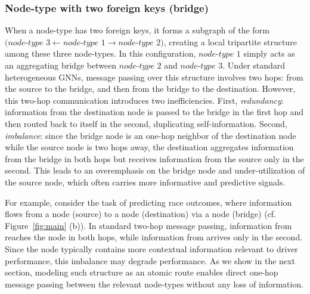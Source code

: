 \documentclass{article}
\theoremstyle{plain}
\theoremstyle{definition}
\theoremstyle{remark}
\begin{document}
\subsubsection{Node-type with two foreign keys (bridge)} 
When a node-type has two foreign keys, it forms a subgraph of the form \(\textit{(node-type 3} \leftarrow \textit{node-type 1} \rightarrow \textit{node-type 2)}\), creating a local tripartite structure among these three node-types. In this configuration, \(\textit{node-type 1}\) simply acts as an aggregating bridge between \(\textit{node-type 2}\) and \(\textit{node-type 3}\).  
Under standard heterogeneous GNNs, message passing over this structure involves two hops: from the source to the bridge, and then from the bridge to the destination. However, this two-hop communication introduces two inefficiencies. First, \textit{redundancy}: information from the destination node is passed to the bridge in the first hop and then routed back to itself in the second, duplicating self-information. Second, \textit{imbalance}: since the bridge node is an one-hop neighbor of the destination node while the source node is two hops away, the destination aggregates information from the bridge in both hops but receives information from the source only in the second. This leads to an overemphasis on the bridge node and under-utilization of the source node, which often carries more informative and predictive signals. 

For example, consider the task of predicting race outcomes, where information flows from a \race node (source) to a \driver node (destination) via a \standing node (bridge) (cf. Figure~\ref{fig:main} (b)). In standard two-hop message passing, information from \standing reaches the \driver node in both hops, while information from \race arrives only in the second. Since the \race node typically contains more contextual information relevant to driver performance, this imbalance may degrade performance.
As we show in the next section, modeling such structure as an atomic route enables direct one-hop message passing between the relevant node-types without any loss of information. 
\end{document}
